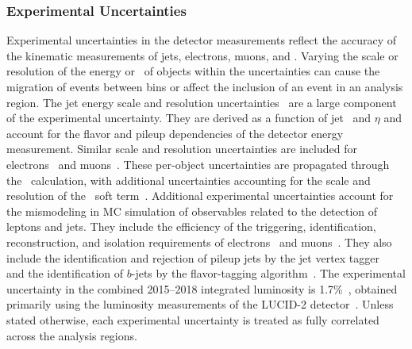 \subsubsection{Experimental Uncertainties }
\label{sec:stats:systs:exp}
Experimental uncertainties in the detector measurements reflect the accuracy of the kinematic measurements of jets, electrons, muons, and \met.
Varying the scale or resolution of the energy or \pt\ of objects within the uncertainties can cause the migration of events between \mZl bins or affect the inclusion of an event in an analysis region.
The jet energy scale and resolution uncertainties~\cite{PERF-2016-04,PERF-2011-04} are a large component of the experimental uncertainty. 
They are derived as a function of jet \pt\ and $\eta$ and account for the flavor and pileup dependencies of the detector energy measurement.
Similar scale and resolution uncertainties are included for electrons~\cite{EGAM-2018-01} and muons~\cite{PERF-2015-10}.
These per-object uncertainties are propagated through the \met\ calculation, with additional uncertainties accounting for the scale and resolution of the \met\ soft term~\cite{PERF-2016-07}.
Additional experimental uncertainties account for the mismodeling in MC simulation of observables related to the detection of leptons and jets.
They include the efficiency of the triggering, identification, reconstruction, and isolation requirements of electrons~\cite{EGAM-2018-01} and muons~\cite{PERF-2015-10}.
They also include the identification and rejection of pileup jets by the jet vertex tagger~\cite{PERF-2014-03} and the identification of $b$-jets by the flavor-tagging algorithm~\cite{FTAG-2018-01}.
The experimental uncertainty in the combined 2015--2018 integrated luminosity is 1.7\%~\cite{ATLAS-CONF-2019-021}, obtained primarily using the luminosity measurements of the LUCID-2 detector~\cite{LUCID2}.
Unless stated otherwise, each experimental uncertainty is treated as fully correlated across the analysis regions.

